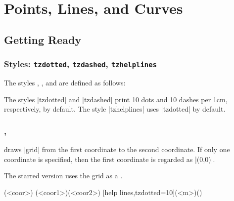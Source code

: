 %

\part{Points, Lines, and Curves}
\label{p:linesandcurves}


\chapter{Getting Ready}
\label{c:gettingready}

\section{Styles: \texttt{tzdotted}, \texttt{tzdashed}, \texttt{tzhelplines}}
\label{s:styles:tzhelplines}

The styles , , and  are defined as follows:

\begin{tzsty}{}
\end{tzsty}

The styles |tzdotted| and |tzdashed| print 10 dots and 10 dashes per 1cm, respectively, by default.
The style |tzhelplines| uses |tzdotted| by default.


\section{\protect\cmd{\tzhelplines}, \protect\cmd{\tzhelplines*}}
\label{s:tzhelplines}

\icmd{\tzhelplines} draws |grid| from the first coordinate to the second coordinate.
If only one coordinate is specified, then the first coordinate is regarded as |(0,0)|.

The starred version \icmd{\tzhelplines*} uses the grid as a .

\begin{tzdef}{}
\tzhelplines(<coor>)
\tzhelplines[<opt>](<coor1>)(<coor2>)
  [help lines,tzdotted=10](<m>)()
\end{tzdef}

